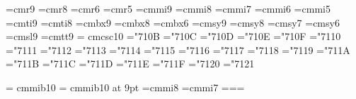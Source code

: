 %
\font\ninerm=cmr9
\font\eightrm=cmr8 
\font\sixrm=cmr6
\font\fiverm=cmr5
%
\font\mitnine=cmmi9
\font\miteight=cmmi8 
\font\mitseven=cmmi7
\font\mitsix=cmmi6
\font\mitfive=cmmi5
%
\font\nineit=cmti9
\font\eightit=cmti8
%
\font\ninebf=cmbx9
\font\eightbf=cmbx8
\font\sixbf=cmbx6
%
\font\ninesy=cmsy9
\font\eightsy=cmsy8 
\font\sevensy=cmsy7
\font\sixsy=cmsy6
%
\font\ninesl=cmsl9
\font\ninett=cmtt9
\font\caps = cmcsc10 
%
%
%
\mathchardef\alpha="710B
\mathchardef\beta="710C
\mathchardef\gamma="710D
\mathchardef\delta="710E
\mathchardef\epsilon="710F
\mathchardef\zeta="7110
\mathchardef\eta="7111
\mathchardef\theta="7112
\mathchardef\iota="7113
\mathchardef\kappa="7114
\mathchardef\lambda="7115
\mathchardef\mu="7116
\mathchardef\nu="7117
\mathchardef\xi="7118
\mathchardef\pi="7119
\mathchardef\rho="711A
\mathchardef\sigma="711B
\mathchardef\tau="711C
\mathchardef\upsilon="711D
\mathchardef\phi="711E
\mathchardef\chi="711F
\mathchardef\psi="7120
\mathchardef\omega="7121

\font\tenbi= cmmib10   
\font\ninebi= cmmib10 at 9pt  
\font\eightbi=cmmi8
\font\sevenbi=cmmi7
\newfam\bmfam
\def\bmit{\fam\bmfam\tenbi}
\textfont\bmfam=\tenbi \scriptfont\bmfam=\eightbi \scriptscriptfont\bmfam=\sevenbi
  
\def\setnine{
\textfont0=\ninerm \scriptfont0=\sixrm \scriptscriptfont0=\fiverm
\textfont1=\mitnine \scriptfont1=\mitsix \scriptscriptfont1=\mitfive
\textfont2=\ninesy \scriptfont2=\sevensy \scriptscriptfont2=\fivesy
\textfont3=\tenex \scriptfont3=\tenex   \scriptscriptfont3=\tenex
\def\rm{\fam0 \ninerm}
\textfont\itfam=\nineit \def\it{\fam\itfam\nineit}
\textfont\slfam=\ninesl \def\sl{\fam\slfam\ninesl}
\textfont\ttfam=\ninett \def\tt{\fam\ttfam\ninett}
\textfont\bffam=\ninebf \scriptfont\bffam=\sevenbf
\scriptscriptfont\bffam=\fivebf \def\bf{\fam\bffam\ninebf}

\textfont\bmfam=\ninebi \scriptfont\bmfam=\sevenbi
\def\bmit{\fam\bmfam\ninebi}

\parskip=0pt plus 0.8pt
\smallskipamount=2.7pt plus 0.8pt minus 0.8pt
\medskipamount=5.4pt plus 1.6pt minus 1.6pt
\bigskipamount=10.8pt plus 3.2pt minus 3.2pt
\normalbaselineskip=10.8pt
\normallineskip=0.8pt
\normallineskiplimit=0pt
\setbox\strutbox=\hbox{\vrule height7.8pt depth3.2pt width0pt}%
\normalbaselines\rm}


\def\seteight{
\textfont0=\eightrm \scriptfont0=\sixrm \scriptscriptfont0=\fiverm
\textfont1=\miteight \scriptfont1=\mitsix \scriptscriptfont1=\mitfive
\textfont2=\eightsy \scriptfont2=\sixsy \scriptscriptfont2=\fivesy
\textfont3=\tenex \scriptfont3=\tenex   \scriptscriptfont3=\tenex
\def\rm{\fam0 \eightrm}
\textfont\itfam=\eightit \def\it{\fam\itfam\eightit}
\textfont\bffam=\eightbf \scriptfont\bffam=\sixbf
\scriptscriptfont\bffam=\fivebf \def\bf{\fam\bffam\eightbf}
\def\sl{\m\slfam\eightsl}
\parskip=0pt plus 0.7pt
\smallskipamount=2.25pt plus 0.7pt minus 0.7pt
\medskipamount=4.5pt plus 1.5pt minus 1.5pt
\bigskipamount=9pt plus 3pt minus 3pt
\normalbaselineskip=9pt
\normallineskip=0.75pt
\normallineskiplimit=0pt
\setbox\strutbox=\hbox{\vrule height7.8pt depth3.2pt width0pt}%
\normalbaselines\rm}
